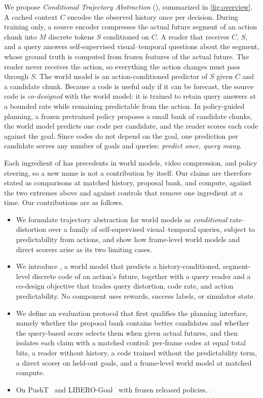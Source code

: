We propose \emph{Conditional Trajectory Abstraction} (\method), summarized in \cref{fig:overview}.
A cached context $C$ encodes the observed history once per decision.
During training only, a source encoder compresses the actual future segment of an action chunk into $M$ discrete tokens $S$ conditioned on $C$.
A reader that receives $C$, $S$, and a query answers self-supervised visual--temporal questions about the segment, whose ground truth is computed from frozen features of the actual future.
The reader never receives the action, so everything the action changes must pass through $S$.
The world model is an action-conditioned predictor of $S$ given $C$ and a candidate chunk.
Because a code is useful only if it can be forecast, the source code is \emph{co-designed} with the world model: it is trained to retain query answers at a bounded rate while remaining predictable from the action.
In policy-guided planning, a frozen pretrained policy proposes a small bank of candidate chunks, the world model predicts one code per candidate, and the reader scores each code against the goal.
Since codes do not depend on the goal, one prediction per candidate serves any number of goals and queries: \emph{predict once, query many}.

Each ingredient of \method has precedents in world models, video compression, and policy steering, so a new name is not a contribution by itself.
Our claims are therefore stated as comparisons at matched history, proposal bank, and compute, against the two extremes above and against controls that remove one ingredient at a time.
Our contributions are as follows.
\begin{itemize}[leftmargin=*,topsep=2pt,itemsep=1pt]
\item We formulate trajectory abstraction for world models as \emph{conditional} rate--distortion over a family of self-supervised visual--temporal queries, subject to predictability from actions, and show how frame-level world models and direct scorers arise as its two limiting cases.
\item We introduce \method, a world model that predicts a history-conditioned, segment-level discrete code of an action's future, together with a query reader and a co-design objective that trades query distortion, code rate, and action predictability. No component uses rewards, success labels, or simulator state.
\item We define an evaluation protocol that first qualifies the planning interface, namely whether the proposal bank contains better candidates and whether the query-based score selects them when given actual futures, and then isolates each claim with a matched control: per-frame codes at equal total bits, a reader without history, a code trained without the predictability term, a direct scorer on held-out goals, and a frame-level world model at matched compute.
\item On PushT~\cite{florence2021ibc,chi2023diffusion} and LIBERO-Goal~\cite{liu2023libero} with frozen released policies, .
\end{itemize}


